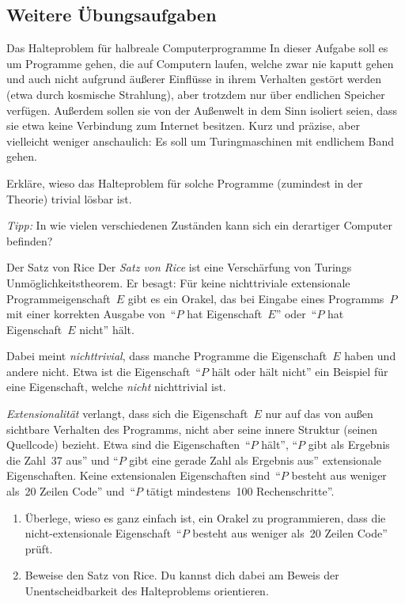 \documentclass[twoside]{../zirkelblatt1415}
\theoremstyle{definition}
\theoremstyle{plain}
\theoremstyle{remark}
\begin{document}
\subsection{Weitere Übungsaufgaben}

\begin{aufgabeShaded}{Das Halteproblem für halbreale Computerprogramme}
In dieser Aufgabe soll es um Programme gehen, die auf Computern laufen, welche
zwar nie kaputt gehen und auch nicht aufgrund äußerer Einflüsse in ihrem
Verhalten gestört werden (etwa durch kosmische Strahlung), aber trotzdem nur
über endlichen Speicher verfügen. Außerdem sollen sie von der Außenwelt in dem
Sinn isoliert seien, dass sie etwa keine Verbindung zum Internet besitzen.
Kurz und präzise, aber vielleicht weniger anschaulich: Es soll um
Turingmaschinen mit endlichem Band gehen.

Erkläre, wieso das Halteproblem für solche Programme (zumindest in der
Theorie) trivial lösbar ist.

\emph{Tipp:} In wie vielen verschiedenen Zuständen kann sich ein derartiger
Computer befinden?
\end{aufgabeShaded}

\begin{aufgabeShaded}{Der Satz von Rice}
Der \emph{Satz von Rice} ist eine Verschärfung von Turings
Unmöglichkeitstheorem. Er besagt: Für keine nichttriviale extensionale
Programmeigenschaft~$E$ gibt es ein Orakel, das bei Eingabe
eines Programms~$P$ mit einer korrekten Ausgabe von~"`$P$ hat Eigenschaft~$E$"'
oder~"`$P$ hat Eigenschaft~$E$ nicht"' hält.

Dabei meint \emph{nichttrivial}, dass manche Programme die Eigenschaft~$E$
haben und andere nicht. Etwa ist die Eigenschaft~"`$P$ hält oder hält nicht"'
ein Beispiel für eine Eigenschaft, welche \emph{nicht} nichttrivial ist.

\emph{Extensionalität} verlangt, dass sich die Eigenschaft~$E$ nur auf das von
außen sichtbare Verhalten des Programms, nicht aber seine innere Struktur
(seinen Quellcode) bezieht. Etwa sind die Eigenschaften~"`$P$ hält"',
"`$P$ gibt als Ergebnis die Zahl~37 aus"' und "`$P$ gibt eine gerade Zahl als
Ergebnis aus"' extensionale Eigenschaften. Keine extensionalen Eigenschaften
sind~"`$P$ besteht aus weniger als~20 Zeilen Code"' und~"`$P$ tätigt
mindestens~100 Rechenschritte"'.

\begin{enumerate}
\item Überlege, wieso es ganz einfach ist, ein Orakel zu programmieren, dass
die nicht-extensionale Eigenschaft~"`$P$ besteht aus weniger als~20 Zeilen
Code"' prüft.
\item Beweise den Satz von Rice. Du kannst dich dabei am Beweis der
Unentscheidbarkeit des Halteproblems orientieren.
\end{enumerate}
\vspace{-1em}
\end{aufgabeShaded}
\end{document}
